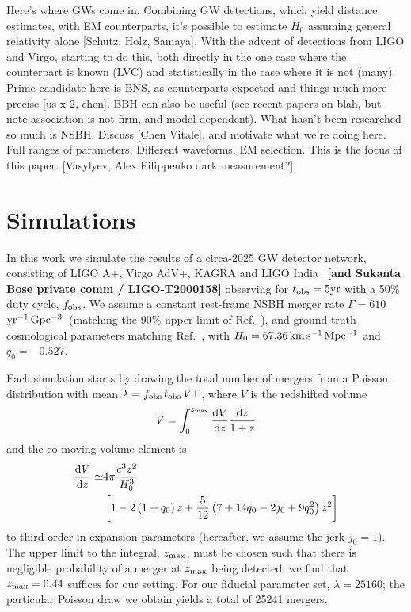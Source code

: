 \documentclass[%
 reprint,
 superscriptaddress,
 nofootinbib,
 amsmath,amssymb,
 aps,
]{revtex4-2}
\newcommand{\hubble}{\ensuremath{H_0}}
\newcommand{\decel}{\ensuremath{q_0}}
\newcommand{\jerk}{\ensuremath{j_0}}
\newcommand{\zmax}{\ensuremath{z_{\rm max}}}
\newcommand{\tobs}{t_{\rm obs}}
\newcommand{\fobs}{f_{\rm obs}}
\newcommand{\kmsmpc}{\ensuremath{{\rm km\,s^{-1}\,Mpc^{-1}}}}
\newcommand{\yr}{\ensuremath{{\rm yr}}}
\newcommand{\yrgpc}{\ensuremath{{\rm yr^{-1}\,Gpc^{-3}}}}
\begin{document}
Here's where GWs come in. Combining GW detections, which yield distance estimates, with EM counterparts, it's possible to estimate $H_0$ assuming general relativity alone [Schutz, Holz, Samaya]. With the advent of detections from LIGO and Virgo, starting to do this, both directly in the one case where the counterpart is known (LVC) and statistically in the case where it is not (many). Prime candidate here is BNS, as counterparts expected and things much more precise [us x 2, chen]. BBH can also be useful (see recent papers on blah, but note association is not firm, and model-dependent). What hasn't been researched so much is NSBH. Discuss [Chen Vitale], and motivate what we're doing here. Full ranges of parameters. Different waveforms. EM selection. This is the focus of this paper. [Vasylyev, Alex Filippenko dark measurement?]


\section{Simulations} \label{sec:sims}

In this work we simulate the results of a circa-2025 GW detector network, consisting of LIGO A+, Virgo AdV+, KAGRA and LIGO India~\cite{Abbott_etal:2013} {\bf [and Sukanta Bose private comm / LIGO-T2000158]} observing for $\tobs = 5 \yr$ with a 50\% duty cycle, $\fobs$. We assume a constant rest-frame  NSBH merger rate $\Gamma = 610$ \yrgpc\ (matching the 90\% upper limit of Ref.~\cite{Ligo:2018}), and ground truth cosmological parameters matching Ref.~\cite{Planck_VI:2018}, with $\hubble=67.36\,\kmsmpc$ and $\decel=-0.527$.


Each simulation starts by drawing the total number of mergers from a Poisson distribution with mean $\lambda = \fobs \, \tobs \, V \, \Gamma $, where $V$ is the redshifted volume
\begin{equation}
V = \int_0^{\zmax} \frac{{\rm d}V}{{\rm d}z} \frac{{\rm d}z}{1+z}
\end{equation}
and the co-moving volume element is
\begin{align}
\frac{{\rm d}V}{{\rm d}z} \simeq & 4\pi \frac{c^3 z^2}{\hubble^3} \\
& \left[1 - 2 \left(1 + \decel \right) z + \frac{5}{12} \left(7 + 14 \decel - 2 \jerk + 9 \decel^2 \right) z^2 \right] \nonumber
\end{align}
to third order in expansion parameters (hereafter, we assume the jerk $j_0 = 1$). The upper limit to the integral, $\zmax$, must be chosen such that there is negligible probability of a merger at $\zmax$ being detected: we find that $\zmax=0.44$ suffices for our setting. For our fiducial parameter set, $\lambda = 25160$; the particular Poisson draw we obtain yields a total of 25241 mergers.
\end{document}
